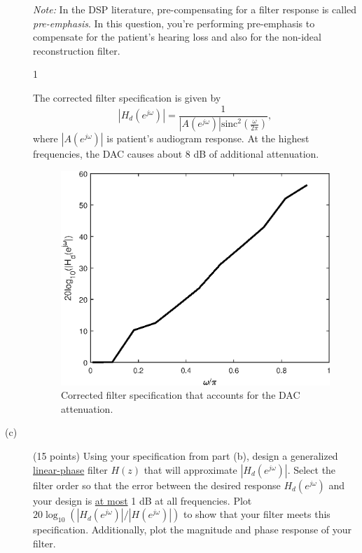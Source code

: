 \documentclass[10pt]{article}
\def\SOLUTIONS{1} %
\def\SolutionsColor{red2}
\begin{document}
\begin{description}
	\noindent\textit{Note:} In the DSP literature, pre-compensating for a filter response is called \textit{pre-emphasis}. In this question, you're performing pre-emphasis to compensate for the patient's hearing loss and also for the non-ideal reconstruction filter.
	
	\if\SOLUTIONS1
	{\color{\SolutionsColor} The corrected filter specification is given by
		\begin{equation*}
			|H_d(e^{j\omega})| = \frac{1}{|A(e^{j\omega})|\mathrm{sinc}^2(\frac{\omega}{2\pi})},
		\end{equation*}
		where $|A(e^{j\omega})|$ is patient's audiogram response. At the highest frequencies, the DAC causes about 8 dB of additional attenuation.
		
		\FloatBarrier
		\begin{figure}[h!]
			\centering
			\includegraphics[scale=0.6]{figs/hearing_aid_corrected_spec.eps}
			\caption{Corrected filter specification that accounts for the DAC attenuation.}
		\end{figure}
		\FloatBarrier
	}
	\fi
		
	\item[(c)] (15 points) Using your specification from part (b), design a generalized \underline{linear-phase} filter $H(z)$ that will approximate $|H_d(e^{j\omega})|$. Select the filter order so that the error between the desired response $H_d(e^{j\omega})$ and your design is \underline{at most} 1 dB at all frequencies. Plot $20\log_{10}(|H_d(e^{j\omega})|/|H(e^{j\omega})|)$ to show that your filter meets this specification. Additionally, plot the magnitude and phase response of your filter. 
	

\end{description}
\end{document}
